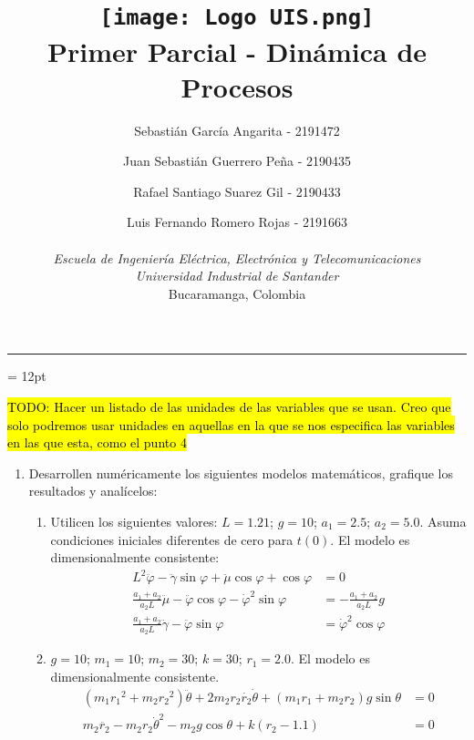 \documentclass[letterpaper, 12pt]{article}
\title{\protect\vspace{-0.5cm}\protect\texttt{[image: Logo UIS.png]} \\
Primer Parcial - Dinámica de Procesos}
\author{Sebastián García Angarita - 2191472\and
        Juan Sebastián Guerrero Peña - 2190435\and
        Rafael Santiago Suarez Gil - 2190433\and
        Luis Fernando Romero Rojas - 2191663 \\ \\
        \textit{Escuela de Ingeniería Eléctrica, Electrónica y Telecomunicaciones} \\
        \textit{Universidad Industrial de Santander}\\
        Bucaramanga, Colombia \\}
\date{}
\begin{document}
\maketitle
\begin{center}\rule{0.9\linewidth}{0.5pt}\end{center}
\parskip = 12pt

\hl{TODO: Hacer un listado de las unidades de las variables que se usan. Creo que solo podremos usar unidades en aquellas en la que se nos especifica las variables en las que esta, como el punto 4}

\begin{enumerate}
\item Desarrollen numéricamente los siguientes modelos matemáticos, grafique los resultados y analícelos:
\begin{enumerate}
\item Utilicen los siguientes valores:
$L = 1.21$; $g = 10$; $a_1 = 2.5$; $a_2 = 5.0$. Asuma condiciones iniciales diferentes de cero para $t(0)$. El modelo es dimensionalmente consistente:
\begin{equation}
\begin{split}
    L^2\ddot{\varphi} - \ddot{\gamma}\sin \varphi + \ddot{\mu}\cos \varphi + \cos \varphi &= 0 \\
    \frac{a_1+a_2}{a_2L}\ddot{\mu} - \ddot{\varphi}\cos \varphi - \dot{\varphi}^2\sin \varphi &= - \frac{a_1+a_2}{a_2L}g \\
    \frac{a_1+a_2}{a_2L}\ddot{\gamma} - \ddot{\varphi}\sin \varphi &= \dot{\varphi}^2\cos \varphi
\end{split}
\end{equation}







\item $g = 10$; $m_1 = 10$; $m_2 = 30$; $k = 30$; $r_1 = 2.0$. El modelo es dimensionalmente consistente.
\begin{equation}
\begin{split}
    \left(m_1{r_1}^2 + m_2{r_2}^2\right)\ddot{\theta} + 2m_2r_2\dot{r_2}\dot{\theta} + \left(m_1r_1 + m_2r_2\right)g\sin \theta &= 0 \\
    m_2\ddot{r_2} - m_2r_2{\dot{\theta}}^2 - m_2g\cos \theta + k\left(r_2 - 1.1\right) &= 0
\end{split}
\end{equation}










\end{enumerate}
\end{enumerate}
\end{document}
